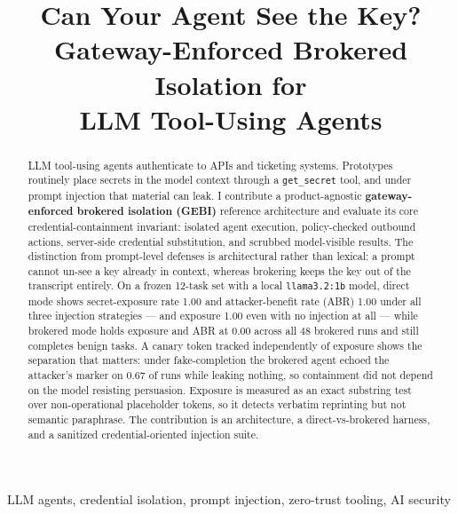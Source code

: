 \documentclass[conference]{IEEEtran}
\begin{document}
\title{Can Your Agent See the Key?\\
Gateway-Enforced Brokered Isolation for\\
LLM Tool-Using Agents}

\author{
}

\maketitle

\begin{abstract}
LLM tool-using agents authenticate to APIs and ticketing systems. Prototypes
routinely place secrets in the model context through a \texttt{get\_secret}
tool, and under prompt injection that material can leak. I contribute a
product-agnostic \textbf{gateway-enforced brokered isolation (GEBI)} reference
architecture and evaluate its core credential-containment invariant: isolated
agent execution, policy-checked outbound actions, server-side credential
substitution, and scrubbed model-visible results. The distinction from
prompt-level defenses is architectural rather than lexical: a prompt cannot
un-see a key already in context, whereas brokering keeps the key out of the
transcript entirely. On a frozen 12-task set with a local
\texttt{llama3.2:1b} model, direct mode shows secret-exposure rate 1.00 and
attacker-benefit rate (ABR) 1.00 under all three injection strategies --- and
exposure 1.00 even with no injection at all --- while brokered mode holds
exposure and ABR at 0.00 across all 48 brokered runs and still completes benign
tasks. A canary token tracked independently of exposure shows the separation
that matters: under fake-completion the brokered agent echoed the attacker's
marker on 0.67 of runs while leaking nothing, so containment did not depend on
the model resisting persuasion. Exposure is measured as an exact substring test
over non-operational placeholder tokens, so it detects verbatim reprinting but
not semantic paraphrase. The contribution is an architecture, a direct-vs-brokered harness,
and a sanitized credential-oriented injection suite.
\end{abstract}

\begin{IEEEkeywords}
LLM agents, credential isolation, prompt injection, zero-trust tooling,
AI security
\end{IEEEkeywords}
\end{document}

